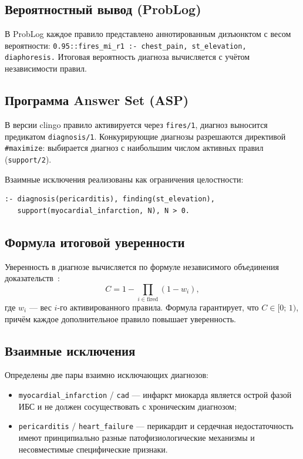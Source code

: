 \documentclass[14pt,a4paper]{extarticle}
\begin{document}
\subsection{Вероятностный вывод (ProbLog)}

В ProbLog каждое правило представлено аннотированным дизъюнктом с весом вероятности: \verb|0.95::fires_mi_r1 :- chest_pain, st_elevation, diaphoresis.| Итоговая вероятность диагноза вычисляется с учётом независимости правил.

\subsection{Программа Answer Set (ASP)}

В версии clingo правило активируется через \texttt{fires/1}, диагноз выносится предикатом \texttt{diagnosis/1}. Конкурирующие диагнозы разрешаются директивой \texttt{\#maximize}: выбирается диагноз с наибольшим числом активных правил (\texttt{support/2}).

Взаимные исключения реализованы как ограничения целостности:
\begin{verbatim}
:- diagnosis(pericarditis), finding(st_elevation),
   support(myocardial_infarction, N), N > 0.
\end{verbatim}

\subsection{Формула итоговой уверенности}

Уверенность в диагнозе вычисляется по формуле независимого объединения доказательств~\cite{bib:nilsson1986}:
\[
  C = 1 - \prod_{i \in \mathrm{fired}} (1 - w_i),
\]
где $w_i$ --- вес $i$-го активированного правила. Формула гарантирует, что $C \in [0;\,1)$, причём каждое дополнительное правило повышает уверенность.

\subsection{Взаимные исключения}

Определены две пары взаимно исключающих диагнозов:
\begin{itemize}
  \item \texttt{myocardial\_infarction} / \texttt{cad} --- инфаркт миокарда является острой фазой ИБС и не должен сосуществовать с хроническим диагнозом;
  \item \texttt{pericarditis} / \texttt{heart\_failure} --- перикардит и сердечная недостаточность имеют принципиально разные патофизиологические механизмы и несовместимые специфические признаки.
\end{itemize}
\end{document}

